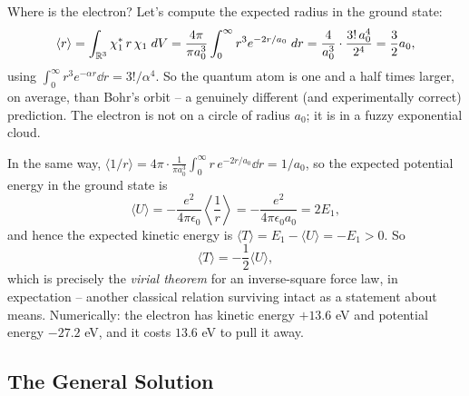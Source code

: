 \documentclass[a4paper]{scrartcl}
\begin{document}
\begin{example}
    Where is the electron? Let's compute the expected radius in the ground state:
    $$
    \langle r \rangle = \int_{\mathbb{R}^3} \chi_1^* \, r \, \chi_1 \; d V = \frac{4 \pi}{\pi a_0^3} \int_0^\infty r^3 e^{-2r/a_0} \; d r = \frac{4}{a_0^3} \cdot \frac{3! \, a_0^4}{2^4} = \frac{3}{2} a_0,
    $$
    using $\int_0^\infty r^3 e^{-\alpha r} \dd r = 3!/\alpha^4$. So the quantum atom is one and a half times larger, on average, than Bohr's orbit -- a genuinely different (and experimentally correct) prediction. The electron is not on a circle of radius $a_0$; it is in a fuzzy exponential cloud.
\end{example}

\begin{example}
    In the same way, $\langle 1/r \rangle = 4 \pi \cdot \frac{1}{\pi a_0^3}\int_0^\infty r \, e^{-2r/a_0} \dd r = 1/a_0$, so the expected potential energy in the ground state is
    $$
    \langle U \rangle = -\frac{e^2}{4 \pi \epsilon_0} \left\langle \frac{1}{r} \right\rangle = -\frac{e^2}{4 \pi \epsilon_0 a_0} = 2 E_1,
    $$
    and hence the expected kinetic energy is $\langle T \rangle = E_1 - \langle U \rangle = -E_1 > 0$. So
    $$
    \langle T \rangle = -\frac{1}{2}\langle U \rangle,
    $$
    which is precisely the \emph{virial theorem} for an inverse-square force law, in expectation -- another classical relation surviving intact as a statement about means. Numerically: the electron has kinetic energy $+13.6$ eV and potential energy $-27.2$ eV, and it costs $13.6$ eV to pull it away.
\end{example}

\subsection{The General Solution}
\end{document}
